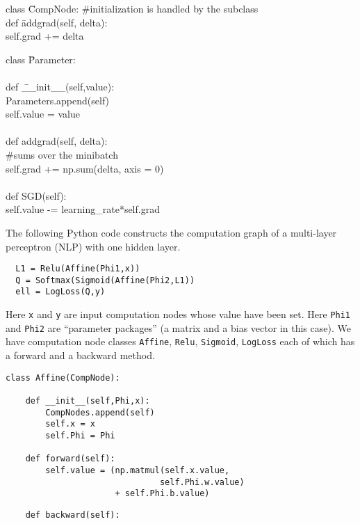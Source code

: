 {\vfill
\begin{tabbing}
class \=CompNode: \#initialization is handled by the subclass \\
   \>def \=addgrad(self, delta): \\
   \>\>self.grad += delta
\end{tabbing}

\slide{}

\begin{tabbing}
class \=Parameter: \\
    \\
    \>def \=\_\_init\_\_(self,value): \\
        \>\>Parameters.append(self) \\
        \>\>self.value = value \\
\\
    \>def \>addgrad(self, delta): \\
          \>\>\#sums over the minibatch \\
    \>\>self.grad += np.sum(delta, axis = 0) \\
    \\
    \>def \>SGD(self): \\
    \>\>self.value -= learning\_rate*self.grad
\end{tabbing}

\medskip

The following Python code constructs the computation graph of a multi-layer perceptron (NLP) with one hidden layer.

\vfill
\begin{verbatim}
  L1 = Relu(Affine(Phi1,x))
  Q = Softmax(Sigmoid(Affine(Phi2,L1))
  ell = LogLoss(Q,y)
\end{verbatim}

\vfill
Here {\tt x} and {\tt y} are input computation nodes
whose value have been set.
Here {\tt Phi1} and {\tt Phi2} are ``parameter packages'' (a matrix and a bias vector in this case).
We have computation node classes {\tt Affine}, {\tt Relu}, {\tt Sigmoid}, {\tt LogLoss} each of which has
a forward and a backward method.

\vfill
\eject
\begin{verbatim}
class Affine(CompNode):

    def __init__(self,Phi,x):
        CompNodes.append(self)
        self.x = x
        self.Phi = Phi

    def forward(self):
        self.value = (np.matmul(self.x.value,
                               self.Phi.w.value)
                      + self.Phi.b.value)
\end{verbatim}
\vfill
\eject
\vfill
\begin{verbatim}
    def backward(self):


\end{verbatim}}
